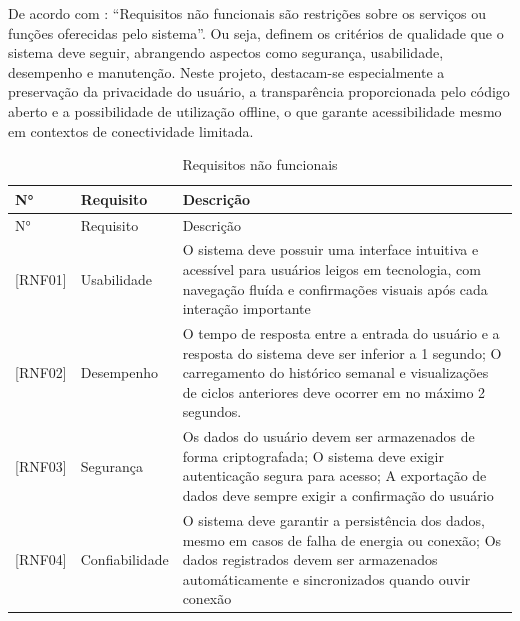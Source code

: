 De acordo com \cite[p.~89]{sommerville:2010}: ``Requisitos não funcionais são
restrições sobre os serviços ou funções oferecidas pelo sistema''. Ou seja,
definem os critérios de qualidade que o sistema deve seguir, abrangendo
aspectos como segurança, usabilidade, desempenho e manutenção. Neste projeto,
destacam-se especialmente a preservação da privacidade do usuário, a
transparência proporcionada pelo código aberto e a possibilidade de utilização
offline, o que garante acessibilidade mesmo em contextos de conectividade
limitada.

\begin{longtable}{| p{} | p{} | p{} |}
    \caption{Requisitos não funcionais}
    \label{tab:requisitos_nao_funcionais} \\
        \hline
        N° & Requisito & Descrição \\
        \hline
        \endfirsthead
        \hline
        N° & Requisito & Descrição \\
        \hline
        \endhead
        \endfoot

        [RNF01] &
        Usabilidade &

        O sistema deve possuir uma interface intuitiva e acessível para
        usuários leigos em tecnologia, com navegação fluída e confirmações
        visuais após cada interação importante \\

        \hline

        [RNF02] &
        Desempenho &

        O tempo de resposta entre a entrada do usuário e a resposta do sistema
        deve ser inferior a 1 segundo; O carregamento do histórico semanal e
        visualizações de ciclos anteriores deve ocorrer em no máximo 2
        segundos. \\

        \hline

        [RNF03] &
        Segurança &

        Os dados do usuário devem ser armazenados de forma criptografada; O
        sistema deve exigir autenticação segura para acesso; A exportação de
        dados deve sempre exigir a confirmação do usuário \\
        \hline

        [RNF04] &
        Confiabilidade &

        O sistema deve garantir a persistência dos dados, mesmo em casos de
        falha de energia ou conexão; Os dados registrados devem ser armazenados
        automáticamente e sincronizados quando ouvir conexão \\


\end{longtable}
